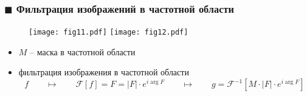 \documentclass[
    12pt, 
    usepdftitle=false,
    aspectratio=1610
]{beamer}
\begin{document}

\begin{frame}
\frametitle{$\blacksquare$ Фильтрация изображений в частотной области}
\begin{figure}
    \centering
    \texttt{[image: fig11.pdf]}
    \texttt{[image: fig12.pdf]}
\end{figure}
\begin{itemize}
    \item $M$ -- маска в частотной области
    \item фильтрация изображения в частотной области
    $$
        f \qquad\mapsto\qquad
        \mathcal{F}[f]=F=|F|\cdot e^{i\arg F}
        \qquad\mapsto\qquad 
        g =\mathcal{F}^{-1}\left[M\cdot |F|\cdot e^{i\arg F}\right]
    $$
\end{itemize}
\end{frame}

\end{document}
